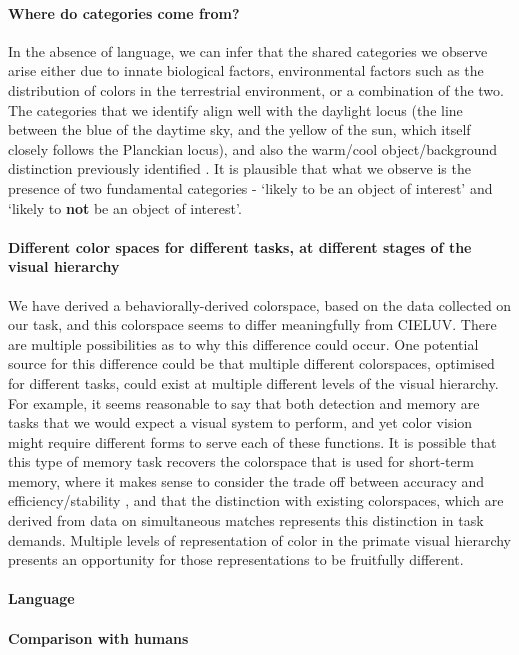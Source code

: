 
\paragraph{Where do categories come from?}
In the absence of language, we can infer that the shared categories we observe arise either due to innate biological factors, environmental factors such as the distribution of colors in the terrestrial environment, or a combination of the two.
The categories that we identify align well with the daylight locus (the line between the blue of the daytime sky, and the yellow of the sun, which itself closely follows the Planckian locus), and also the warm/cool object/background distinction previously identified \citep{rosenthal_color_2018}. It is plausible that what we observe is the presence of two fundamental categories - `likely to be an object of interest' and `likely to \textbf{not} be an object of interest'. 


\paragraph{Different color spaces for different tasks, at different stages of the visual hierarchy}

We have derived a behaviorally-derived colorspace, based on the data collected on our task, and this colorspace seems to differ meaningfully from CIELUV. %
There are multiple possibilities as to why this difference could occur.
One potential source for this difference could be that multiple different colorspaces, optimised for different tasks, could exist at multiple different levels of the visual hierarchy.
For example, it seems reasonable to say that both detection and memory are tasks that we would expect a visual system to perform, and yet color vision might require different forms to serve each of these functions.
It is possible that this type of memory task recovers the colorspace that is used for short-term memory, where it makes sense to consider the trade off between accuracy and efficiency/stability \citep{panichello_error-correcting_2019}, and that the distinction with existing colorspaces, which are derived from data on simultaneous matches represents this distinction in task demands.
Multiple levels of representation of color in the primate visual hierarchy presents an opportunity for those representations to be fruitfully different.

\paragraph{Language}

\paragraph{Comparison with humans} %
